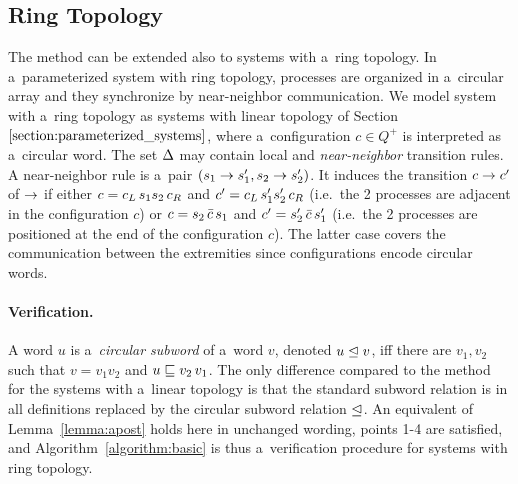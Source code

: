 \subsection{Ring Topology}
\label{section:rings}
The method can be extended also to systems with a~ring topology.
In a~parameterized system with ring topology, processes are organized in a~circular array and they synchronize by near-neighbor communication.
We model system with a~ring topology as systems with linear topology of Section~$\ref{section:parameterized_systems}$, where a~configuration $c\in Q^+$ is interpreted as a~circular word. 
%
The set $\Delta$ may contain local and \emph{near-neighbor} transition rules. 
A near-neighbor rule is a~pair $(s_1\rightarrow s_1',s_2\rightarrow s_2')$.
It induces the transition $c\rightarrow c'$ of $\rightarrow$ if either
$c = c_L\,s_1s_2\,c_R$ and $c' =
c_L\,s_1's_2'\,c_R$ (i.e.\ the 2 processes are adjacent
in the configuration $c$) or $c = s_2\,\bar{c}\,s_1$ and
$c' = s_2'\,\bar{c}\,s_1'$ (i.e.\ the 2 processes are
positioned at the end of the configuration $c$). The latter case
covers the communication between the extremities since configurations
encode circular words.

\paragraph{Verification.}
A word $u$ is a~\emph{circular subword} of a~word $v$, denoted $u\trianglelefteq v$, iff there are $v_1,v_2$ such that $v = v_1v_2$ and $u \sqsubseteq v_2\,v_1$.
The only difference compared to the method for the systems with a~linear topology is  
that the standard subword relation is in all definitions replaced by
the circular subword relation $\trianglelefteq$. 
%
An equivalent of Lemma~\ref{lemma:apost} holds here in unchanged
wording, points 1-4 are satisfied, and Algorithm~\ref{algorithm:basic}
is thus a~verification procedure for systems with ring topology.

